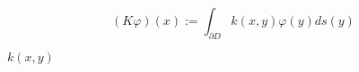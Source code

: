 \documentclass{article}
\begin{document}
\[ (K\varphi)(x):=\int_{\partial D} k(x,y) \varphi(y) ds(y)\]
\pagebreak

$ k(x,y) $
\pagebreak
\end{document}
